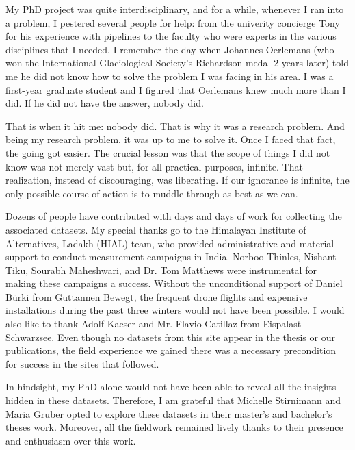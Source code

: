 My PhD project was quite interdisciplinary, and for a while, whenever I ran into a problem, I pestered several people for help: from the univerity concierge Tony for his experience with pipelines to the faculty who
were experts in the various disciplines that I needed. I remember the day when Johannes Oerlemans (who won the
International Glaciological Society's Richardson medal 2 years later) told me he did not know how to solve the
problem I was facing in his area. I was a first-year graduate student and I figured that Oerlemans knew much
more than I did. If he did not have the answer, nobody did.

That is when it hit me: nobody did. That is why it was a research problem. And being my research problem, it was
up to me to solve it. Once I faced that fact, the going got easier. The crucial lesson was that the scope of things I
did not know was not merely vast but, for all practical purposes, infinite. That realization, instead of
discouraging, was liberating. If our ignorance is infinite, the only possible course of action is to muddle
through as best as we can.

Dozens of people have contributed with days and days of work for collecting the associated datasets. My special
thanks go to the Himalayan Institute of Alternatives, Ladakh (HIAL) team, who provided administrative and
material support to conduct measurement campaigns in India. Norboo Thinles, Nishant Tiku, Sourabh Maheshwari, and
Dr. Tom Matthews were instrumental for making these campaigns a success. Without the unconditional support of
Daniel Bürki from Guttannen Bewegt, the frequent drone flights and expensive installations during the past three
winters would not have been possible. I would also like to thank Adolf Kaeser and Mr. Flavio Catillaz from
Eispalast Schwarzsee. Even though no datasets from this site appear in the thesis or our publications, the field
experience we gained there was a necessary precondition for success in the sites that followed. 

In hindsight, my PhD alone would not have been able to reveal all the insights hidden in these datasets.
Therefore, I am grateful that Michelle Stirnimann and Maria Gruber opted to explore these datasets in their
master's and bachelor's theses work. Moreover, all the fieldwork remained lively thanks to their presence and
enthusiasm over this work.

